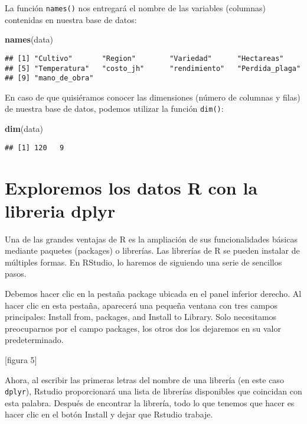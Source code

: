 \documentclass[]{book}
\newenvironment{Shaded}{\begin{snugshade}}{\end{snugshade}}
\newcommand{\KeywordTok}[1]{\textcolor[rgb]{0.13,0.29,0.53}{\textbf{#1}}}
\newcommand{\NormalTok}[1]{#1}
\begin{document}
La función \texttt{names()} nos entregará el nombre de las variables (columnas) contenidas en nuestra base de
datos:

\begin{Shaded}
\begin{Highlighting}[]
\KeywordTok{names}\NormalTok{(data)}
\end{Highlighting}
\end{Shaded}

\begin{verbatim}
## [1] "Cultivo"       "Region"        "Variedad"      "Hectareas"    
## [5] "Temperatura"   "costo_jh"      "rendimiento"   "Perdida_plaga"
## [9] "mano_de_obra"
\end{verbatim}

En caso de que quisiéramos conocer las dimensiones (número de columnas y filas) de nuestra base de datos,
podemos utilizar la función \texttt{dim()}:

\begin{Shaded}
\begin{Highlighting}[]
\KeywordTok{dim}\NormalTok{(data)}
\end{Highlighting}
\end{Shaded}

\begin{verbatim}
## [1] 120   9
\end{verbatim}

\hypertarget{exploremos-los-datos-r-con-la-libreria-dplyr}{%
\section{Exploremos los datos R con la libreria dplyr}\label{exploremos-los-datos-r-con-la-libreria-dplyr}}

Una de las grandes ventajas de R es la ampliación de sus funcionalidades básicas mediante paquetes
(packages) o librerías. Las librerías de R se pueden instalar de múltiples formas. En RStudio, lo haremos de
siguiendo una serie de sencillos pasos.

Debemos hacer clic en la pestaña package ubicada en el panel inferior derecho. Al hacer clic en esta pestaña,
aparecerá una pequeña ventana con tres campos principales: Install from, packages, and Install to Library.
Solo necesitamos preocuparnos por el campo packages, los otros dos los dejaremos en su valor
predeterminado.

{[}figura 5{]}

Ahora, al escribir las primeras letras del nombre de una librería (en este caso \texttt{dplyr}), Rstudio proporcionará
una lista de librerías disponibles que coincidan con esta palabra. Después de encontrar la librería, todo lo
que tenemos que hacer es hacer clic en el botón Install y dejar que Rstudio trabaje.
\end{document}

